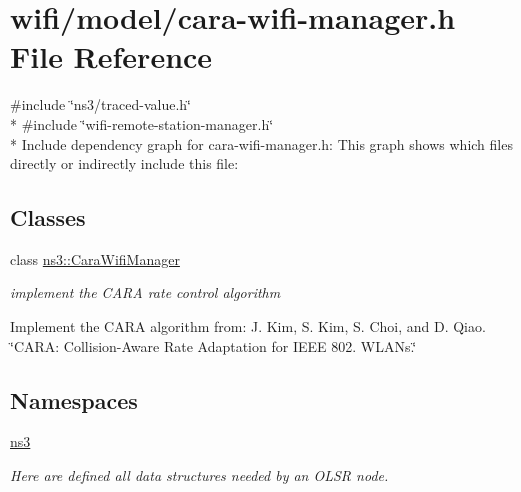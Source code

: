 \hypertarget{cara-wifi-manager_8h}{}\section{wifi/model/cara-\/wifi-\/manager.h File Reference}
\label{cara-wifi-manager_8h}
{\ttfamily \#include \char`\"{}ns3/traced-\/value.\+h\char`\"{}}\\*
{\ttfamily \#include \char`\"{}wifi-\/remote-\/station-\/manager.\+h\char`\"{}}\\*
Include dependency graph for cara-\/wifi-\/manager.h\+:
This graph shows which files directly or indirectly include this file\+:
\subsection*{Classes}
\begin{DoxyCompactItemize}
\item 
class \hyperlink{classns3_1_1CaraWifiManager}{ns3\+::\+Cara\+Wifi\+Manager}
\begin{DoxyCompactList}\small\item\em implement the C\+A\+RA rate control algorithm

Implement the C\+A\+RA algorithm from\+: J. Kim, S. Kim, S. Choi, and D. Qiao. \char`\"{}\+C\+A\+R\+A\+: Collision-\/\+Aware Rate Adaptation for I\+E\+E\+E 802. W\+L\+A\+Ns.\char`\"{} \end{DoxyCompactList}\end{DoxyCompactItemize}
\subsection*{Namespaces}
\begin{DoxyCompactItemize}
\item 
 \hyperlink{namespacens3}{ns3}
\begin{DoxyCompactList}\small\item\em Here are defined all data structures needed by an O\+L\+SR node. \end{DoxyCompactList}\end{DoxyCompactItemize}
